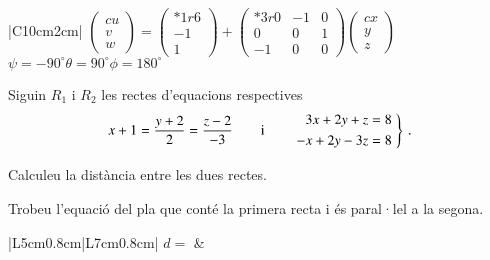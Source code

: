 \documentclass[10pt,catalan]{article}
\begin{document}
\begin{solucio}
\begin{center}
\begin{tabular}{|C{10cm}{2cm}|}
\hline
$\begin{pmatrix}{c} u \\ v \\ w\end{pmatrix} = 
\begin{pmatrix}{*{1}r} 6\\ -1\\ 1\end{pmatrix} + 
\begin{pmatrix}{*{3}r} 0 & -1 & 0\\ 0 & 0 & 1\\ -1 & 0 & 0\end{pmatrix}
\begin{pmatrix}{c} x \\ y \\ z\end{pmatrix}$ \\
\hline
{}
{$\psi=-90^\circ$\hspace{1.7cm}$\theta=90^\circ$\hspace{1.7cm}$\phi=180^\circ$} \\
\hline
\end{tabular}
\end{center}
\end{solucio}





\begin{enunciat}
Siguin $R_1$ i $R_2$ les rectes d'equacions respectives
\[
  x + 1 = \frac{y + 2}{2} = \frac{z - 2}{-3}\qquad\text{i}\qquad \left.\aligned 3 x + 2 y + z &= 8 \\ - x + 2 y - 3 z &= 8 \endaligned\;\right\}\,.
\]
\begin{apartats}
\item Calculeu la distància entre les dues rectes.
\item Trobeu l'equació del pla que conté la primera recta i és paral·lel a la segona. 
\end{apartats}
\end{enunciat}

\begin{quadricula}
\begin{tabular}{|L{5cm}{0.8cm}|L{7cm}{0.8cm}|}
\hline
$d=$ & \\ 
\hline
\end{tabular}
\end{quadricula}
\end{document}
